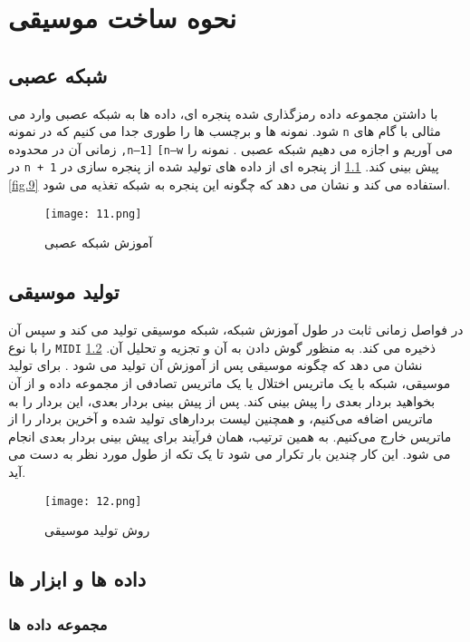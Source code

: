 \chapter{نحوه ساخت موسیقی}
\section{شبکه عصبی}
با داشتن مجموعه داده رمزگذاری شده پنجره ای، داده ها  به شبکه عصبی وارد می شود. نمونه ها و برچسب ها را طوری جدا می کنیم که
در نمونه 
\verb;n;
مثالی با گام های زمانی آن در محدوده 
\verb;,n–1];
\verb;[n–w;
می آوریم و اجازه می دهیم شبکه عصبی . 
نمونه را در
\verb;n + 1;
پیش بینی کند. 
\cref{fig.11}
از پنجره ای از داده های تولید شده از پنجره سازی در 
\cref{fig.9}
استفاده می کند و نشان می دهد که چگونه این
پنجره به شبکه تغذیه می شود. 

\begin{figure}[!h]
\texttt{[image: 11.png]}
\caption{آموزش شبکه عصبی}\label{fig.11}
\end{figure}

\section{تولید موسیقی}
در فواصل زمانی ثابت در طول آموزش شبکه، شبکه موسیقی تولید می کند و سپس آن را با نوع 
\verb;MIDI;
ذخیره می کند. 
به منظور گوش دادن به آن و تجزیه و تحلیل آن. 
\cref{fig.12}
نشان می دهد که چگونه موسیقی پس از آموزش آن تولید می شود
 . برای تولید موسیقی،  شبکه با یک ماتریس اختلال یا یک ماتریس تصادفی از
مجموعه داده و از آن بخواهید بردار بعدی را پیش بینی کند.  پس از پیش بینی بردار بعدی،  این بردار را به 
ماتریس اضافه می‌کنیم،  و همچنین لیست بردارهای تولید شده و آخرین بردار را از ماتریس خارج می‌کنیم.  به همین ترتیب، همان
فرآیند برای پیش بینی بردار بعدی انجام می شود. این کار چندین بار تکرار می شود تا یک تکه از طول مورد نظر
 به دست می آید. 


\begin{figure}[!h]
\texttt{[image: 12.png]}
\caption{روش تولید موسیقی}\label{fig.12}
\end{figure}

\section{داده ها و ابزار ها}
\subsection{مجموعه داده ها}

